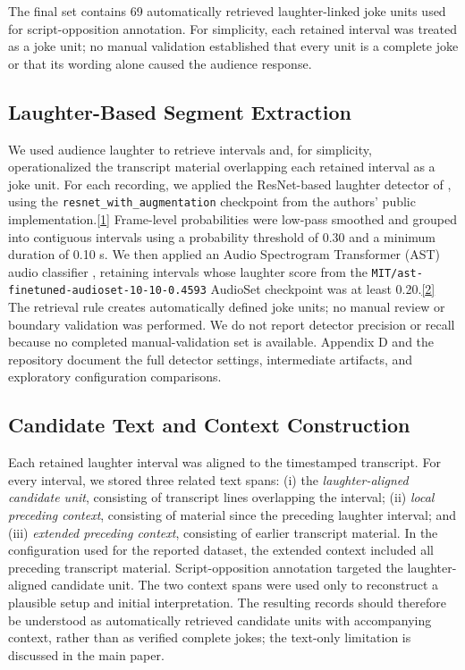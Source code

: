 \documentclass[11pt]{article}
\begin{document}
The final set contains 69 automatically retrieved laughter-linked joke units used for script-opposition annotation. For simplicity, each retained interval was treated as a joke unit; no manual validation established that every unit is a complete joke or that its wording alone caused the audience response.

\subsection{Laughter-Based Segment Extraction}\label{laughter-based-segment-extraction}

We used audience laughter to retrieve intervals and, for simplicity, operationalized the transcript material overlapping each retained interval as a joke unit. For each recording, we applied the ResNet-based laughter detector of \citet{gillick2021robust}, using the \texttt{resnet\_with\_augmentation} checkpoint from the authors' public implementation.\href{https://github.com/jrgillick/laughter-detection}{{[}1{]}} Frame-level probabilities were low-pass smoothed and grouped into contiguous intervals using a probability threshold of 0.30 and a minimum duration of 0.10 s. We then applied an Audio Spectrogram Transformer (AST) audio classifier \citep{gong2021ast}, retaining intervals whose laughter score from the \texttt{MIT/ast-finetuned-audioset-10-10-0.4593} AudioSet checkpoint was at least 0.20.\href{https://huggingface.co/MIT/ast-finetuned-audioset-10-10-0.4593}{{[}2{]}} The retrieval rule creates automatically defined joke units; no manual review or boundary validation was performed. We do not report detector precision or recall because no completed manual-validation set is available. Appendix D and the repository document the full detector settings, intermediate artifacts, and exploratory configuration comparisons.

\subsection{Candidate Text and Context Construction}\label{candidate-text-and-context-construction}

Each retained laughter interval was aligned to the timestamped transcript. For every interval, we stored three related text spans: (i) the \emph{laughter-aligned candidate unit}, consisting of transcript lines overlapping the interval; (ii) \emph{local preceding context}, consisting of material since the preceding laughter interval; and (iii) \emph{extended preceding context}, consisting of earlier transcript material. In the configuration used for the reported dataset, the extended context included all preceding transcript material. Script-opposition annotation targeted the laughter-aligned candidate unit. The two context spans were used only to reconstruct a plausible setup and initial interpretation. The resulting records should therefore be understood as automatically retrieved candidate units with accompanying context, rather than as verified complete jokes; the text-only limitation is discussed in the main paper.
\end{document}

